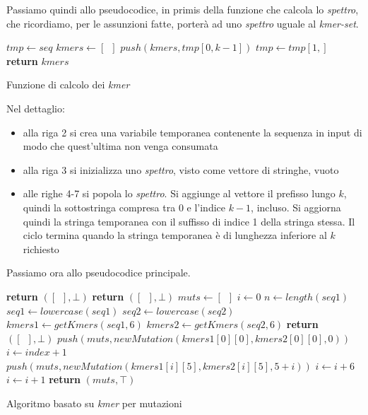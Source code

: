\documentclass[a4paper,12pt, oneside]{book}
\begin{document}
\newpage
\noindent
Passiamo quindi allo pseudocodice, in primis della funzione che calcola lo
\textit{spettro}, che ricordiamo, per le assunzioni fatte, porterà ad uno
\textit{spettro} uguale al \textit{kmer-set}. 
\begin{algorithm}[H]
  \begin{algorithmic}[1]
    \State $tmp\gets seq$
    \State $kmers \gets [\,\,\,]$
    \State $push(kmers, tmp[0,k-1])$
    \State $tmp \gets tmp[1,]$
    \EndWhile
    \State \textbf{return} $kmers$
    \EndFunction
  \end{algorithmic}
  \caption{Funzione di calcolo dei \textit{kmer}}
\end{algorithm}
\noindent
Nel dettaglio:
\begin{itemize}
  \item alla riga 2 si crea una variabile temporanea contenente la sequenza in
  input di modo che quest'ultima non venga consumata
  \item alla riga 3 si inizializza uno \textit{spettro}, visto come vettore di
  stringhe, vuoto
  \item alle righe 4-7 si popola lo \textit{spettro}. Si aggiunge al vettore il
  prefisso lungo $k$, quindi la sottostringa compresa tra 0 e l'indice $k-1$,
  incluso. Si aggiorna quindi la stringa temporanea con il suffisso di indice 1
  della stringa stessa. Il ciclo termina quando la stringa temporanea è di
  lunghezza inferiore al $k$ richiesto
\end{itemize}
\newpage
\noindent
Passiamo ora allo pseudocodice principale.
\begin{algorithm}[H]
  \begin{algorithmic}[1]
    \State \textbf{return} $([\,\,\,],\bot)$
    \EndIf
    \State \textbf{return} $([\,\,\,],\bot)$
    \EndIf
    \State $muts \gets [\,\,\,]$
    \State $i\gets 0$
    \State $n\gets length(seq1)$
    \State $seq1\gets lowercase(seq1)$
    \State $seq2\gets lowercase(seq2)$
    \State $kmers1\gets getKmers(seq1,6)$
    \State $kmers2\gets getKmers(seq2,6)$
    \State \textbf{return} $([\,\,\,],\bot)$
    \EndIf
    \State $push(muts, newMutation(kmers1[0][0], kmers2[0][0], 0))$
    \State $i \gets index+1$
    \EndIf
    \State $push(muts, newMutation(kmers1[i][5], kmers2[i][5], 5+i))$
    \State $i\gets i+6$
    \Else
    \State $i\gets i+1$
    \EndIf
    \EndWhile
    \State \textbf{return} $(muts, \top)$
    \EndFunction
  \end{algorithmic}
  \caption{Algoritmo basato su \textit{kmer} per mutazioni}
\end{algorithm}
\end{document}

